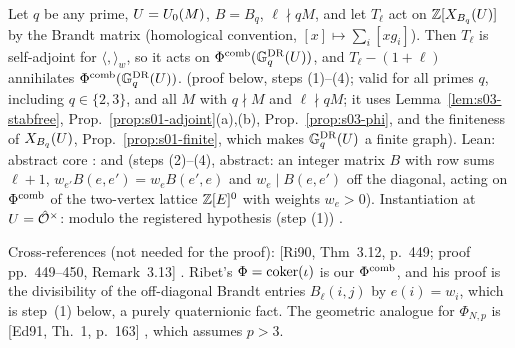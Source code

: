 \begin{proposition}\label{prop:s03-phieis}
Let $q$ be any prime, $U=U_0(M)$, $B=B_q$, $\ell\nmid qM$, and let $T_\ell$ act on $\mathbb{Z}[X_{B_q}(U)]$ by the Brandt matrix (homological
convention, $[x]\mapsto\sum_i[xg_i]$). Then $T_\ell$ is self-adjoint for $\langle,\rangle_w$, so it acts on $\Phi^{\mathrm{comb}}(\mathbb{G}^{\mathrm{DR}}_q(U))$, and
$T_\ell-(1+\ell)$ annihilates $\Phi^{\mathrm{comb}}(\mathbb{G}^{\mathrm{DR}}_q(U))$. \stproved{} (proof below, steps (1)--(4); valid for all primes $q$, including $q\in\{2,3\}$, and all
$M$ with $q\nmid M$ and $\ell\nmid qM$; it uses Lemma~\ref{lem:s03-stabfree}, Prop.~\ref{prop:s01-adjoint}(a),(b), Prop.~\ref{prop:s03-phi}, and the
finiteness of $X_{B_q}(U)$, Prop.~\ref{prop:s01-finite}, which makes $\mathbb{G}^{\mathrm{DR}}_q(U)$ a finite graph). Lean: abstract core \stformal{}:  and  (steps (2)--(4), abstract: an integer matrix $B$ with row sums $\ell+1$,
$w_{e'}B(e,e')=w_eB(e',e)$ and $w_e\mid B(e,e')$ off the diagonal, acting on $\Phi^{\mathrm{comb}}$ of the two-vertex lattice $\mathbb{Z}[E]^0$ with weights $w_e>0$). Instantiation at $U=\hat{\mathcal{O}}^\times$:  \stformal{} modulo the registered hypothesis (step (1)) .

Cross-references (not needed for the proof): [Ri90, Thm~3.12, p.~449; proof pp.~449--450, Remark~3.13] \stcited{}
. Ribet's $\Phi=\operatorname{coker}(\iota)$ is our
$\Phi^{\mathrm{comb}}$, and his proof is the divisibility of the off-diagonal Brandt entries $B_\ell(i,j)$ by $e(i)=w_i$, which is step~(1) below, a purely quaternionic
fact. The geometric analogue for $\Phi_{N,p}$ is [Ed91, Th.~1, p.~163] \stcited{}
, which assumes $p>3$.
\end{proposition}
